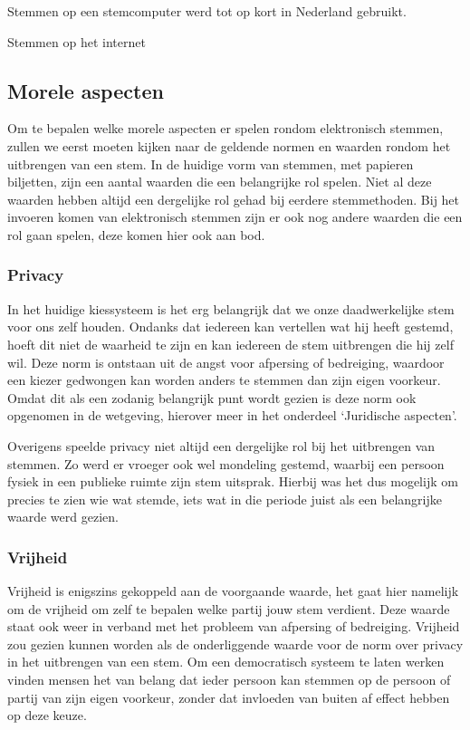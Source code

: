 \documentclass[a4paper]{article}
\begin{document}
Stemmen op een stemcomputer werd tot op kort in Nederland gebruikt.

Stemmen op het internet

\subsection{Morele aspecten}
Om te bepalen welke morele aspecten er spelen rondom elektronisch stemmen, zullen we eerst moeten kijken naar de geldende normen en waarden rondom het uitbrengen van een stem.
In de huidige vorm van stemmen, met papieren biljetten, zijn een aantal waarden die een belangrijke rol spelen.
Niet al deze waarden hebben altijd een dergelijke rol gehad bij eerdere stemmethoden.
Bij het invoeren komen van elektronisch stemmen zijn er ook nog andere waarden die een rol gaan spelen, deze komen hier ook aan bod.

\subsubsection{Privacy}
In het huidige kiessysteem is het erg belangrijk dat we onze daadwerkelijke stem voor ons zelf houden.
Ondanks dat iedereen kan vertellen wat hij heeft gestemd, hoeft dit niet de waarheid te zijn en kan iedereen de stem uitbrengen die hij zelf wil.
Deze norm is ontstaan uit de angst voor afpersing of bedreiging, waardoor een kiezer gedwongen kan worden anders te stemmen dan zijn eigen voorkeur.
Omdat dit als een zodanig belangrijk punt wordt gezien is deze norm ook opgenomen in de wetgeving, hierover meer in het onderdeel `Juridische aspecten'.

Overigens speelde privacy niet altijd een dergelijke rol bij het uitbrengen van stemmen.
Zo werd er vroeger ook wel mondeling gestemd, waarbij een persoon fysiek in een publieke ruimte zijn stem uitsprak.
Hierbij was het dus mogelijk om precies te zien wie wat stemde, iets wat in die periode juist als een belangrijke waarde werd gezien.

\subsubsection{Vrijheid}
Vrijheid is enigszins gekoppeld aan de voorgaande waarde, het gaat hier namelijk om de vrijheid om zelf te bepalen welke partij jouw stem verdient.
Deze waarde staat ook weer in verband met het probleem van afpersing of bedreiging.
Vrijheid zou gezien kunnen worden als de onderliggende waarde voor de norm over privacy in het uitbrengen van een stem.
Om een democratisch systeem te laten werken vinden mensen het van belang dat ieder persoon kan stemmen op de persoon of partij van zijn eigen voorkeur, zonder dat invloeden van buiten af effect hebben op deze keuze.
\end{document}
